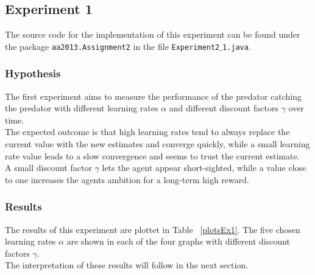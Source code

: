 \documentclass[11pt]{article}
\begin{document}

\subsection{Experiment 1}

The source code for the implementation of this experiment can be found under the package \texttt{aa2013.Assignment2} in the file \texttt{Experiment2$\_$1.java}.
\subsubsection{Hypothesis}
The first experiment aims to measure the performance of the predator catching the predator with different learning rates $\alpha$ and different discount factors $\gamma$ over time.\\
The expected outcome is that high learning rates tend to always replace the current value with the new estimates and converge quickly, while a small learning rate value leads to a slow convergence and seems to trust the current estimate. ~\cite{dar}\\
A small discount factor $\gamma$ lets the agent appear short-sighted, while a value close to one increases the agents ambition for a long-term high reward.

\subsubsection{Results}
The results of this experiment are plottet in Table ~\ref{plotsEx1}. The five chosen learning rates $\alpha$ are shown in each of the four graphs with different discount factors $\gamma$.\\
The interpretation of these results will follow in the next section.
\end{document}
